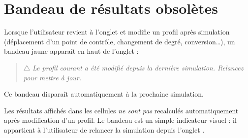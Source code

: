 \section{Bandeau de résultats obsolètes}

Lorsque l'utilisateur revient à l'onglet  et modifie
un profil après simulation (déplacement d'un point de contrôle,
changement de degré, conversion\dots), un bandeau jaune apparaît
en haut de l'onglet  :

\begin{quote}
\textcolor{orange!75!black}{$\triangle$
\emph{Le profil courant a été modifié depuis la dernière
simulation. Relancez pour mettre à jour.}}
\end{quote}

Ce bandeau disparaît automatiquement à la prochaine simulation.

\begin{important}
Les résultats affichés dans les cellules \emph{ne sont pas}
recalculés automatiquement après modification d'un profil.
Le bandeau est un simple indicateur visuel : il appartient
à l'utilisateur de relancer la simulation depuis l'onglet
.
\end{important}

